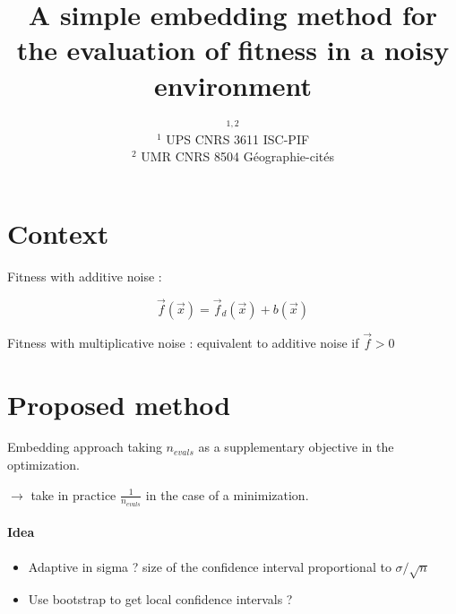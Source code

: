 


\title{A simple embedding method for the evaluation of fitness in a noisy environment}
\author{$^{1,2}$\\
$^1$ UPS CNRS 3611 ISC-PIF\\
$^2$ UMR CNRS 8504 G{\'e}ographie-cit{\'e}s
}
\date{}


\maketitle

\justify





\section{Context}


Fitness with additive noise :

\[
\vec{f}(\vec{x}) = \vec{f}_d(\vec{x}) + b(\vec{x})
\]


Fitness with multiplicative noise : equivalent to additive noise if $\vec{f} > 0$


\section{Proposed method}

Embedding approach taking $n_{evals}$ as a supplementary objective in the optimization.

$\rightarrow$ take in practice $\frac{1}{n_{evals}}$ in the case of a minimization.



\paragraph{Idea}

\begin{itemize}
\item Adaptive in sigma ? size of the confidence interval proportional to $\sigma / \sqrt{n}$
\item Use bootstrap to get local confidence intervals ?
\end{itemize}






























